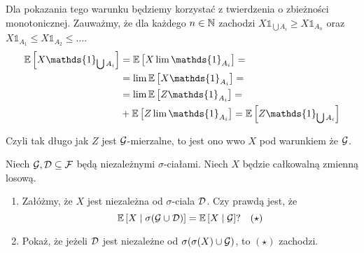 \begin{solution}
\begin{enumerate}
      Dla pokazania tego warunku będziemy korzystać z twierdzenia o zbieżności monotonicznej. Zauważmy, że dla każdego $n\in\operatorname{\mathbb{N}}$ zachodzi $X\mathds{1}_{\bigcup A_i}\geq X\mathds{1}_{A_n}$ oraz $X\mathds{1}_{A_1}\leq X\mathds{1}_{A_2}\leq...$.
      \begin{align*}
        \expected{X\mathds{1}_{\bigcup A_i}}&=\expected{X\lim\mathds{1}_{A_i}}=\\ 
                                            &=\lim\expected{X\mathds{1}_{A_i}}=\\ 
                                            &=\lim\expected{Z\mathds{1}_{A_i}}=\\ 
                                            &+\expected{Z\lim\mathds{1}_{A_i}}=\expected{Z\mathds{1}_{\bigcup A_i}}
      \end{align*}
  \end{enumerate}
  Czyli tak długo jak $Z$ jest $\mathcal{G}$-mierzalne, to jest ono wwo $X$ pod warunkiem że $\mathcal{G}$.
\end{solution}

\begin{problem}
  Niech $\mathcal{G}, \mathcal{D}\subseteq\mathcal{F}$ będą niezależnymi $\sigma$-ciałami. Niech $X$ będzie całkowalną zmienną losową.
  \begin{enumerate}[label=(\alph*)]
    \item Załóżmy, że $X$ jest niezależna od $\sigma$-ciala $\mathcal{D}$. Czy prawdą jest, że 
      $$\expected{X}{\sigma(\set{G}\cup\set{D})}=\expected{X}{\set{G}}?\quad (\star)$$
    \item Pokaż, że jeżeli $\mathcal{D}$ jest niezależne od $\sigma(\sigma(X)\cup\mathcal{G})$, to $(\star)$ zachodzi.
  \end{enumerate}
\end{problem}
